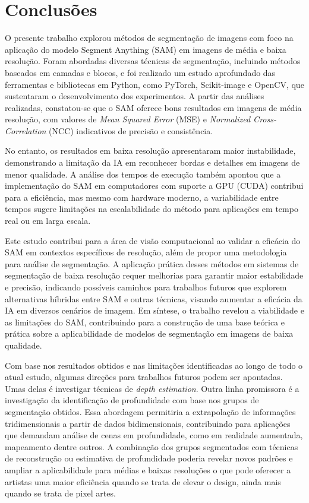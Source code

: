 \chapter{Conclusões}
\label{cap:05}

O presente trabalho explorou métodos de segmentação de imagens com foco na aplicação do modelo Segment Anything (SAM) em imagens de média e baixa resolução. Foram abordadas diversas técnicas de segmentação, incluindo métodos baseados em camadas e blocos, e foi realizado um estudo aprofundado das ferramentas e bibliotecas em Python, como PyTorch, Scikit-image e OpenCV, que sustentaram o desenvolvimento dos experimentos. A partir das análises realizadas, constatou-se que o SAM oferece bons resultados em imagens de média resolução, com valores de \textit{Mean Squared Error} (MSE) e \textit{Normalized Cross-Correlation} (NCC) indicativos de precisão e consistência. 

No entanto, os resultados em baixa resolução apresentaram maior instabilidade, demonstrando a limitação da IA em reconhecer bordas e detalhes em imagens de menor qualidade. A análise dos tempos de execução também apontou que a implementação do SAM em computadores com suporte a GPU (CUDA) contribui para a eficiência, mas mesmo com hardware moderno, a variabilidade entre tempos sugere limitações na escalabilidade do método para aplicações em tempo real ou em larga escala.

Este estudo contribui para a área de visão computacional ao validar a eficácia do SAM em contextos específicos de resolução, além de propor uma metodologia para análise de segmentação. A aplicação prática desses métodos em sistemas de segmentação de baixa resolução requer melhorias para garantir maior estabilidade e precisão, indicando possíveis caminhos para trabalhos futuros que explorem alternativas híbridas entre SAM e outras técnicas, visando aumentar a eficácia da IA em diversos cenários de imagem. Em síntese, o trabalho revelou a viabilidade e as limitações do SAM, contribuindo para a construção de uma base teórica e prática sobre a aplicabilidade de modelos de segmentação em imagens de baixa qualidade.

Com base nos resultados obtidos e nas limitações identificadas ao longo de todo o atual estudo, algumas direções para trabalhos futuros podem ser apontadas.
Umas delas é investigar técnicas de \textit{depth estimation}. Outra linha promissora é a investigação da identificação de profundidade com base nos grupos de segmentação obtidos. Essa abordagem permitiria a extrapolação de informações tridimensionais a partir de dados bidimensionais, contribuindo para aplicações que demandam análise de cenas em profundidade, como em realidade aumentada, mapeamento dentre outros. A combinação dos grupos segmentados com técnicas de reconstrução ou estimativa de profundidade poderia revelar novos padrões e ampliar a aplicabilidade para médias e baixas resoluções o que pode oferecer a artistas uma maior eficiência quando se trata de elevar o design, ainda mais quando se trata de pixel artes.